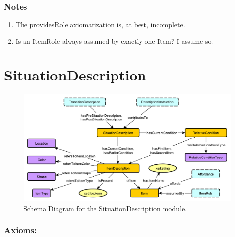 \subsubsection*{Notes}
\begin{enumerate}
\item The \textsf{providesRole} axiomatization is, at best, incomplete.
\item Is an \textsf{ItemRole} always assumed by exactly one \textsf{Item}? I assume so.
\end{enumerate}

\newpage
\section{SituationDescription}
\label{ssec:situationdescription}

\begin{figure}[h!]
\begin{center}
\includegraphics[width=.8\textwidth]{resources/SituationDescription.pdf}
\end{center}
\caption{Schema Diagram for the \textsf{SituationDescription} module.}
\label{fig:sitdesc}
\end{figure}

\subsubsection*{Axioms:}

